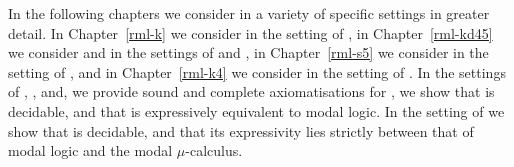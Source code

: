 In the following chapters we consider \logicRml{} in a variety of specific settings in greater detail.
In Chapter~\ref{rml-k} we consider \logicRmlK{} in the setting of \classK{}, in Chapter~\ref{rml-kd45} we consider \logicRmlKFF{} and \logicRmlKD{} in the settings of \classKFF{} and \classKD{}, in Chapter~\ref{rml-s5} we consider \logicRmlS{} in the setting of \classS{}, and in Chapter~\ref{rml-k4} we consider \logicRmlKF{} in the setting of \classKF{}.
In the settings of \classK{}, \classKFF{}, \classKD{} and, \classS{} we provide sound and complete axiomatisations for \logicRml{}, we show that \logicRml{} is decidable, and that \logicRml{} is expressively equivalent to modal logic.
In the setting of \classKF{} we show that \logicRml{} is decidable, and that its expressivity lies strictly between that of modal logic and the modal $\mu$-calculus.
